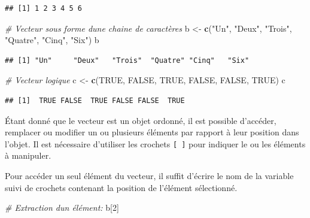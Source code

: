 \documentclass[
]{book}
\newenvironment{Shaded}{\begin{snugshade}}{\end{snugshade}}
\newcommand{\CommentTok}[1]{\textcolor[rgb]{0.56,0.35,0.01}{\textit{#1}}}
\newcommand{\ConstantTok}[1]{\textcolor[rgb]{0.56,0.35,0.01}{#1}}
\newcommand{\DecValTok}[1]{\textcolor[rgb]{0.00,0.00,0.81}{#1}}
\newcommand{\FunctionTok}[1]{\textcolor[rgb]{0.13,0.29,0.53}{\textbf{#1}}}
\newcommand{\NormalTok}[1]{#1}
\newcommand{\OtherTok}[1]{\textcolor[rgb]{0.56,0.35,0.01}{#1}}
\newcommand{\StringTok}[1]{\textcolor[rgb]{0.31,0.60,0.02}{#1}}
\begin{document}
\begin{verbatim}
## [1] 1 2 3 4 5 6
\end{verbatim}

\begin{Shaded}
\begin{Highlighting}[]
\CommentTok{\# Vecteur sous forme d\textquotesingle{}une chaine de caractères}
\NormalTok{b }\OtherTok{\textless{}{-}} \FunctionTok{c}\NormalTok{(}\StringTok{"Un"}\NormalTok{, }\StringTok{"Deux"}\NormalTok{, }\StringTok{"Trois"}\NormalTok{, }\StringTok{"Quatre"}\NormalTok{, }\StringTok{"Cinq"}\NormalTok{, }\StringTok{"Six"}\NormalTok{)}
\NormalTok{b}
\end{Highlighting}
\end{Shaded}

\begin{verbatim}
## [1] "Un"     "Deux"   "Trois"  "Quatre" "Cinq"   "Six"
\end{verbatim}

\begin{Shaded}
\begin{Highlighting}[]
\CommentTok{\# Vecteur logique}
\NormalTok{c }\OtherTok{\textless{}{-}} \FunctionTok{c}\NormalTok{(}\ConstantTok{TRUE}\NormalTok{, }\ConstantTok{FALSE}\NormalTok{, }\ConstantTok{TRUE}\NormalTok{, }\ConstantTok{FALSE}\NormalTok{, }\ConstantTok{FALSE}\NormalTok{, }\ConstantTok{TRUE}\NormalTok{)}
\NormalTok{c}
\end{Highlighting}
\end{Shaded}

\begin{verbatim}
## [1]  TRUE FALSE  TRUE FALSE FALSE  TRUE
\end{verbatim}

Étant donné que le vecteur est un objet ordonné, il est possible d'accéder, remplacer ou modifier un ou plusieurs éléments par rapport à leur position dans l'objet. Il est nécessaire d'utiliser les crochets \texttt{{[}\ {]}} pour indiquer le ou les éléments à manipuler.

Pour accéder un seul élément du vecteur, il suffit d'écrire le nom de la variable suivi de crochets contenant la position de l'élément sélectionné.

\begin{Shaded}
\begin{Highlighting}[]
\CommentTok{\# Extraction d\textquotesingle{}un élément:}
\NormalTok{b[}\DecValTok{2}\NormalTok{]}
\end{Highlighting}
\end{Shaded}
\end{document}
